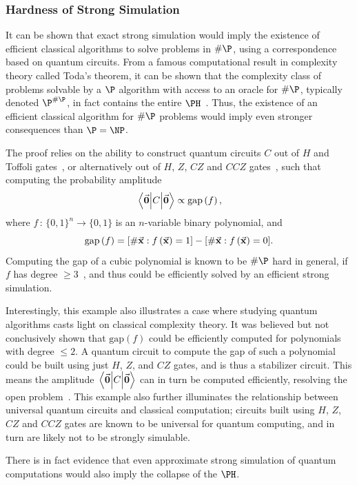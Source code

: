 \subsubsection*{Hardness of Strong Simulation}
It can be shown that exact strong simulation would imply the existence of efficient classical algorithms to solve problems in $\#\P$, using a correspondence based on quantum circuits. From a famous computational result in complexity theory called Toda's theorem, it can be shown that the complexity class of problems solvable by a $\P$ algorithm with access to an oracle for $\#\P$, typically denoted $\P^{\#\P}$, in fact contains the entire $\PH$~\cite{Toda1991}. Thus, the existence of an efficient classical algorithm for $\#\P$ problems would imply even stronger consequences than $\P=\NP$.\par
The proof relies on the ability to construct quantum circuits $C$ out of $H$ and Toffoli gates~\cite{Dawson2004}, or alternatively out of $H$, $Z$, $CZ$ and $CCZ$ gates~\cite{Montanaro2017}, such that computing the probability amplitude 
\[\matrixel{\va{0}}{C}{\va{0}} \propto \text{gap}\left(f\right),\]
where $f\,:\,\{0,1\}^{n}\rightarrow \{0,1\}$ is an $n$-variable binary polynomial, and
\[\text{gap}\left(f\right) = [\# \va{x}:f\left(\va{x}\right)=1] - [\# \va{x}:f\left(\va{x}\right)=0].\]
Computing the gap of a cubic polynomial is known to be $\#\P$ hard in general, if $f$ has degree $\geq 3$~\cite{Montanaro2017}, and thus could be efficiently solved by an efficient strong simulation.\par
Interestingly, this example also illustrates a case where studying quantum algorithms casts light on classical complexity theory. It was believed but not conclusively shown that $\text{gap}\left(f\right)$ could be efficiently computed for polynomials with degree $\leq 2$. A quantum circuit to compute the gap of such a polynomial could be built using just $H$, $Z$, and $CZ$ gates, and is thus a stabilizer circuit. This means the amplitude $\matrixel{\va{0}}{C}{\va{0}}$ can in turn be computed efficiently, resolving the open problem~\cite{Montanaro2017}. This example also further illuminates the relationship between universal quantum circuits and classical computation; circuits built using $H$, $Z$, $CZ$ and $CCZ$ gates are known to be universal for quantum computing, and in turn are likely not to be strongly simulable.\par
There is in fact evidence that even approximate strong simulation of quantum computations would also imply the collapse of the $\PH$.
